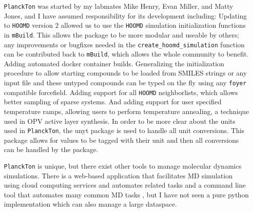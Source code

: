 \texttt{PlanckTon} was started by my labmates Mike Henry, Evan Miller, and Matty Jones\cite{Jankowski2019, planckton}, and I have assumed responsibility for its development including:
Updating to \texttt{HOOMD} version 2 allowed us to use the \texttt{HOOMD} simulation initialization functions in \texttt{mBuild}. This allows the package to be more modular and useable by others; any improvements or bugfixes needed in the \lstinline{create_hoomd_simulation} function can be contributed back to \texttt{mBuild}, which allows the whole community to benefit.
Adding automated docker container builds.
Generalizing the initialization procedure to allow starting compounds to be loaded from SMILES strings or any input file and these untyped compounds can be typed on the fly using any \texttt{foyer} compatible forcefield.
Adding support for all \texttt{HOOMD} neighborlists, which allows better sampling of sparse systems. 
And adding support for user specified temperature ramps, allowing users to perform temperature annealing, a technique used in OPV active layer synthesis.
In order to be more clear about the units used in \texttt{PlanckTon}, the unyt package is used to handle all unit conversions. This package allows for values to be tagged with their unit and then all conversions can be handled by the package.

\texttt{PlanckTon} is unique, but there exist other tools to manage molecular dynamics simulations. There is a web-based application that facilitates MD simulation using cloud computing services and automates related tasks \citep{Nicolas-Barreales2021} and a command line tool that automates many common MD tasks \citep{Rackers2018}, but I have not seen a pure python implementation which can also manage a large dataspace.

